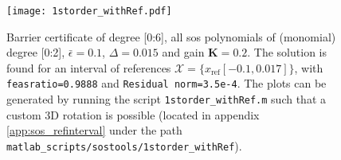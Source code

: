 \vspace{-2mm}
\begin{figure}[H]
\centering
\texttt{[image: 1storder\_withRef.pdf]}
\caption{Barrier certificate of degree [0:6], all \gls{sos} polynomials of (monomial) degree [0:2], $\bar{\epsilon}=0.1$, $\Delta=0.015$ and gain $\textbf{K}=0.2$. The solution is found for an interval of references $\mathcal{X}=\{x_\text{ref}[-0.1,0.017] \}$, with \texttt{feasratio=0.9888} and \texttt{Residual norm=3.5e-4}. The plots can be generated by running the script \texttt{1storder\_withRef.m} such that a custom 3D rotation is possible (located in appendix \ref{app:sos_refinterval} under the path \texttt{matlab\_scripts/sostools/1storder\_withRef}).}
\label{fig:1storder_withRef}
\end{figure}




